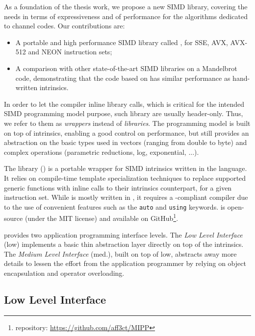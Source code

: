 As a foundation of the thesis work, we propose a new \Cxx SIMD library, covering
the needs in terms of expressiveness and of performance for the algorithms
dedicated to channel codes. Our contributions are:
\begin{itemize}
  \item A portable and high performance  \Cxx SIMD library called \MIPP, for
    SSE, AVX, AVX-512 and NEON instruction sets;
  \item A comparison with other state-of-the-art SIMD libraries on a Mandelbrot
    code, demonstrating that the code based on \MIPP has similar performance as
    hand-written intrinsics.
\end{itemize}
In order to let the compiler inline library calls, which is critical for the
intended SIMD programming model purpose, such library are usually header-only.
Thus, we refer to them as \textit{wrappers} instead of \textit{libraries}.
The \MIPP programming model is built on top of intrinsics, enabling a good
control on performance, but still provides an abstraction on the basic types
used in vectors (ranging from double to byte) and complex operations (parametric
reductions, log, exponential, ...).

The \longMIPP library (\MIPP) is a portable wrapper for SIMD intrinsics written
in the \Cxx language. It relies on \Cxx compile-time template specialization
techniques to replace supported generic functions with inline calls to their
intrinsics counterpart, for a given instruction set. While \MIPP is mostly
written in , it requires a -compliant compiler due to the use of
convenient features such as the \verb|auto| and \verb|using| keywords. \MIPP is
open-source (under the MIT license) and available on GitHub\footnote{\MIPP
repository: \url{https://github.com/aff3ct/MIPP}}.

\MIPP provides two application programming interface levels. The
\emph{Low Level Interface} (low) implements a basic thin abstraction layer
directly on top of the intrinsics. The \emph{Medium Level Interface} (med.),
built on top of \MIPP low, abstracts away more details to lessen the effort from
the application programmer by relying on object encapsulation and operator
overloading.

\subsection{Low Level Interface}

